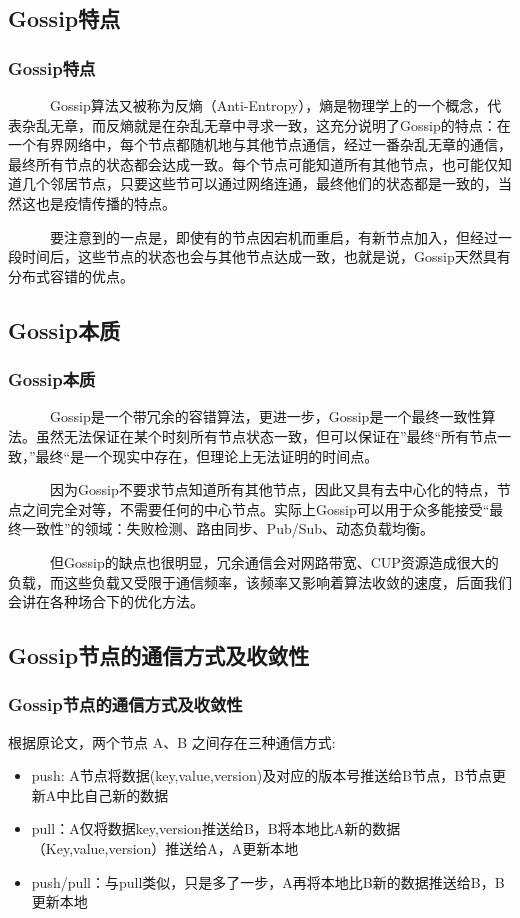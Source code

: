 \documentclass[slidestop,compress,mathserif,c]{beamer}
\begin{document}
\subsection{\hfill Gossip特点}
\begin{frame}
\frametitle{Gossip特点}
~~~~~~Gossip算法又被称为反熵（Anti-Entropy），熵是物理学上的一个概念，代表杂乱无章，而反熵就是在杂乱无章中寻求一致，这充分说明了Gossip的特点：在一个有界网络中，每个节点都随机地与其他节点通信，经过一番杂乱无章的通信，最终所有节点的状态都会达成一致。每个节点可能知道所有其他节点，也可能仅知道几个邻居节点，只要这些节可以通过网络连通，最终他们的状态都是一致的，当然这也是疫情传播的特点。

~~~~~~要注意到的一点是，即使有的节点因宕机而重启，有新节点加入，但经过一段时间后，这些节点的状态也会与其他节点达成一致，也就是说，Gossip天然具有分布式容错的优点。
\end{frame}

\subsection{\hfill Gossip本质}
\begin{frame}
\frametitle{Gossip本质}
~~~~~~Gossip是一个带冗余的容错算法，更进一步，Gossip是一个最终一致性算法。虽然无法保证在某个时刻所有节点状态一致，但可以保证在”最终“所有节点一致，”最终“是一个现实中存在，但理论上无法证明的时间点。

~~~~~~因为Gossip不要求节点知道所有其他节点，因此又具有去中心化的特点，节点之间完全对等，不需要任何的中心节点。实际上Gossip可以用于众多能接受“最终一致性”的领域：失败检测、路由同步、Pub/Sub、动态负载均衡。

~~~~~~但Gossip的缺点也很明显，冗余通信会对网路带宽、CUP资源造成很大的负载，而这些负载又受限于通信频率，该频率又影响着算法收敛的速度，后面我们会讲在各种场合下的优化方法。
\end{frame}

\subsection{\hfill  Gossip节点的通信方式及收敛性}
\begin{frame}
\frametitle{ Gossip节点的通信方式及收敛性}
 根据原论文，两个节点 A、B 之间存在三种通信方式:
 \begin{itemize}
 \item push: A节点将数据(key,value,version)及对应的版本号推送给B节点，B节点更新A中比自己新的数据
 \item pull：A仅将数据key,version推送给B，B将本地比A新的数据（Key,value,version）推送给A，A更新本地
 \item push/pull：与pull类似，只是多了一步，A再将本地比B新的数据推送给B，B更新本地
 \end{itemize}
\end{frame}
\end{document}

